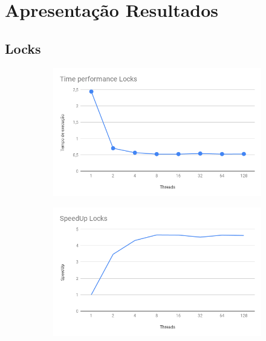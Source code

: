 \documentclass{article}
\begin{document}
\section{Apresentação Resultados}
\subsection{Locks}
\begin{figure}[!htb]
  \centering
  \begin{subfigure}{.5\textwidth}
    \centering
    \includegraphics[width=.9\linewidth]{Charts/Time_performance_Locks.png}

  \end{subfigure}%
  \begin{subfigure}{.5\textwidth}
    \centering
    \includegraphics[width=.9\linewidth]{Charts/SpeedUp_Locks.png}
  \end{subfigure}
\end{figure}
\end{document}
